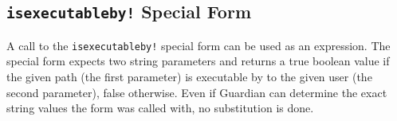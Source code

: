 
\subsection{\texttt{isexecutableby!} Special Form}
{
	A call to the \texttt{isexecutableby!} special form
	can be used as an expression.
	The special form expects two string parameters and returns a true boolean
	value if the given path (the first parameter) is executable by to
	the given user (the second parameter), false
	otherwise.
	Even if Guardian can determine the exact string values the form was
	called with, no substitution is done.
}
